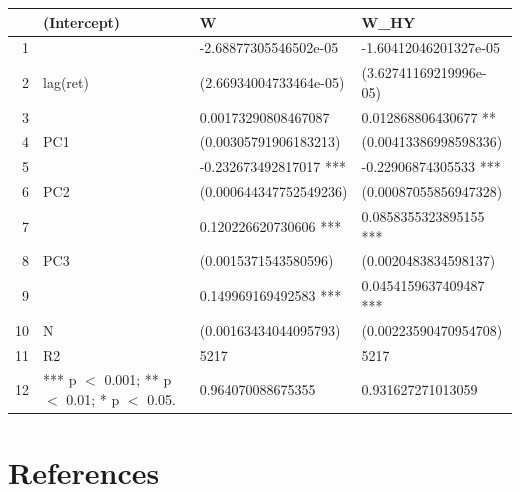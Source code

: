 \documentclass[11pt,preprint, authoryear]{elsarticle}
\let\origtable\table
\let\endorigtable\endtable
\renewenvironment{table}[1][2] {
    \expandafter\origtable\expandafter[H]
} {
    \endorigtable
}
\numberwithin{equation}{section}
\numberwithin{figure}{section}
\numberwithin{table}{section}
\begin{document}
\begin{table}[H]
\centering
\begin{tabular}{rlll}
  \hline
 & (Intercept) & W & W\_HY \\ 
  \hline
1 &  & -2.68877305546502e-05 & -1.60412046201327e-05 \\ 
  2 & lag(ret) & (2.66934004733464e-05) & (3.62741169219996e-05) \\ 
  3 &  & 0.00173290808467087 & 0.012868806430677 ** \\ 
  4 & PC1 & (0.00305791906183213) & (0.00413386998598336) \\ 
  5 &  & -0.232673492817017 *** & -0.22906874305533 *** \\ 
  6 & PC2 & (0.000644347752549236) & (0.00087055856947328) \\ 
  7 &  & 0.120226620730606 *** & 0.0858355323895155 *** \\ 
  8 & PC3 & (0.0015371543580596) & (0.0020483834598137) \\ 
  9 &  & 0.149969169492583 *** & 0.0454159637409487 *** \\ 
  10 & N & (0.00163434044095793) & (0.00223590470954708) \\ 
  11 & R2 & 5217 & 5217 \\ 
  12 & *** p $<$ 0.001;  ** p $<$ 0.01;  * p $<$ 0.05. & 0.964070088675355 & 0.931627271013059 \\ 
   \hline
\end{tabular}
\caption{PCA Results} 
\end{table}
\newpage

\hypertarget{references}{%
\section*{References}\label{references}}
\end{document}
